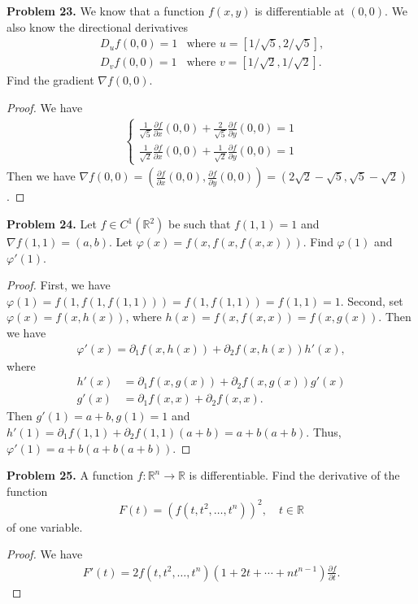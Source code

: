 \documentclass[12pt,leqno]{amsart}
\theoremstyle{definition}
\begin{document}
\medskip

\noindent
{\bf Problem 23.}
We know that a function $f(x,y)$ is differentiable at $(0,0)$. We also know the
directional derivatives
$$
\begin{array}{ccc}
D_uf(0,0)=1    & \mbox{where $u=[1/\sqrt{5},2/\sqrt{5}]$,}\\
D_vf(0,0)=1 &   \mbox{where $v=[1/\sqrt{2},1/\sqrt{2}]$}.
\end{array}
$$
Find the gradient $\nabla f(0,0)$.
\begin{proof}
We have 
\begin{align*}
    \left\{
    \begin{aligned}
        \frac{1}{\sqrt{5}}\frac{\partial f}{\partial x}(0,0) + \frac{2}{\sqrt{5}}\frac{\partial f}{\partial y}(0,0) = 1\\
        \frac{1}{\sqrt{2}}\frac{\partial f}{\partial x}(0,0) + \frac{1}{\sqrt{2}}\frac{\partial f}{\partial y}(0,0) = 1
    \end{aligned}
    \right.
\end{align*}
Then we have $\nabla f(0,0) = \left(\frac{\partial f}{\partial x}(0,0), \frac{\partial f}{\partial y}(0,0) \right) = \left(2\sqrt{2}-\sqrt{5}, \sqrt{5}-\sqrt{2} \right)$.
\end{proof}

\medskip

\noindent
{\bf Problem 24.}
Let $f\in C^1(\mathbb{R}^2)$ be such that $f(1,1)=1$ and $\nabla f(1,1)=(a,b)$.
Let $\varphi(x)=f(x,f(x,f(x,x)))$. Find $\varphi(1)$ and $\varphi'(1)$.
\begin{proof}
First, we have $\varphi(1) = f(1,f(1,f(1,1))) = f(1,f(1,1)) = f(1,1) = 1$. Second, set $\varphi(x) = f(x, h(x))$, where $h(x) = f(x, f(x,x)) = f(x,g(x))$. Then we have
\begin{align*}
    \varphi'(x) = \partial_1 f(x, h(x)) + \partial_2 f(x, h(x)) h'(x),
\end{align*}
where 
\begin{align*}
    h'(x) & = \partial_1 f(x,g(x)) + \partial_2 f(x,g(x)) g'(x) \\
    g'(x) & = \partial_1 f(x,x) + \partial_2 f(x,x) .
\end{align*}
Then $g'(1) = a+b, g(1) = 1$ and $h'(1) = \partial_1 f(1,1) + \partial_2 f(1,1) (a+b) =a + b(a+b)$. Thus, $\varphi'(1) = a + b (a + b(a+b))$.
\end{proof}

\medskip

\noindent
{\bf Problem 25.}
A function $f:\mathbb{R}^n\to\mathbb{R}$ is differentiable. Find the derivative of the function
$$
F(t)=(f(t,t^2,\ldots,t^n))^2,\quad t\in\mathbb{R}
$$
of one variable.
\begin{proof}
We have
\begin{align*}
    F'(t) = 2 f(t,t^2,\ldots,t^n) (1 + 2t + \cdots + n t^{n-1}) \frac{\partial f}{\partial t}.
\end{align*}
\end{proof}
\end{document}
